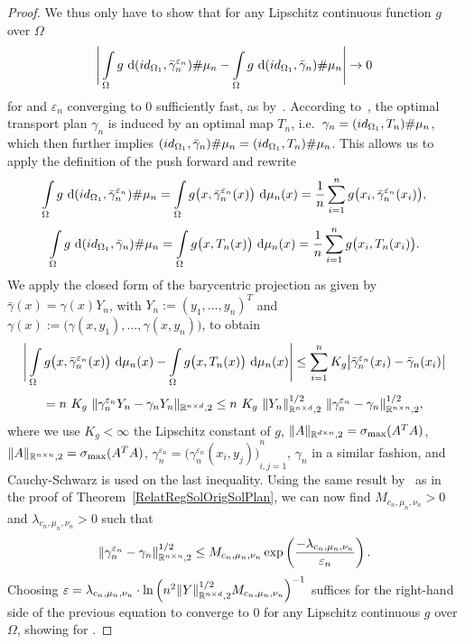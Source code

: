 \begin{proof}
	We thus only have to show that for any Lipschitz continuous function $g$ over $\Omega$
	\[ \Bigg\lvert \int\limits_{\Omega} g~\D[{\push[(id_{\Omega_1}, \bar{\gamma}_n^{\varepsilon_n})]{\mu_n}}] - \int\limits_{\Omega} g~\D[{\push[(id_{\Omega_1}, \bar{\gamma}_n)]{\mu_n}}] \Bigg\rvert \rightarrow 0 \]
	for \Ninf{} and $\varepsilon_n$ converging to $0$ sufficiently fast, as  by\ \cite[Theorem~5.20]{Vill2009}. According to\ \cite{Seg2018}, the optimal transport plan $\gamma_n$ is induced by an optimal map $T_n$, i.e.~$\gamma_n = \push[(id_{\Omega_1}, T_n)]{\mu_n}$, which then further implies $\push[(id_{\Omega_1}, \bar{\gamma}_n)]{\mu_n} = \push[(id_{\Omega_1}, T_n)]{\mu_n}$. This allows us to apply the definition of the push forward and rewrite
	\[ \int\limits_{\Omega} g~\D[{\push[(id_{\Omega_1}, \bar{\gamma}_n^{\varepsilon_n})]{\mu_n}}] = \int\limits_{\Omega} g\big( x, \bar{\gamma}_n^{\varepsilon_n}(x) \big)~\Dx{\mu_n} = \frac{1}{n} \sum\limits_{i = 1}^n g\big( x_i, \bar{\gamma}_n^{\varepsilon_n}(x_i) \big), \]
	\[ \int\limits_{\Omega} g~\D[{\push[(id_{\Omega_1}, \bar{\gamma}_n)]{\mu_n}}] = \int\limits_{\Omega} g\big( x, T_n(x) \big)~\Dx{\mu_n} = \frac{1}{n} \sum\limits_{i = 1}^n g\big( x_i, T_n(x_i) \big). \]
	We apply the closed form of the barycentric projection as given by\ \cite{Seg2018} $\bar{\gamma}(x) = \gamma(x) Y_n$, with $Y_n := {(y_1, \dots, y_n)}^T$ and $\gamma(x) := \big( \gamma(x, y_1), \dots, \gamma(x, y_n) \big)$, to obtain
	\[ \Bigg\lvert \int\limits_{\Omega} g\big( x, \bar{\gamma}_n^{\varepsilon_n}(x) \big)~\Dx{\mu_n} - \int\limits_{\Omega} g\big( x, T_n(x) \big)~\Dx{\mu_n} \Bigg\rvert \le \sum\limits_{i = 1}^n K_g \big\vert \bar{\gamma}_n^{\varepsilon_n}(x_i) - \bar{\gamma}_n(x_i) \big\vert \]
	\[ = n~K_g~\Vert \gamma_n^{\varepsilon_n} Y_n - \gamma_n Y_n \Vert_{\R^{n \times d}, 2} \le n~K_g~\Vert Y_n \Vert_{\R^{n \times d}, 2}^{1/2}~\Vert \gamma_n^{\varepsilon_n} - \gamma_n \Vert^{1/2}_{\R^{n \times n}, 2}, \]
	where we use $K_g < \infty$ the Lipschitz constant of $g$, $\Vert A \Vert_{\R^{d \times n}, 2} = \sigma_{\max}(A^T A)$, $\Vert A \Vert_{\R^{n \times n}, 2} = \sigma_{\max}(A^T A)$, $\gamma_n^{\varepsilon_n} = {\big( \gamma_n^{\varepsilon_n}(x_i, y_j) \big)}_{i, j = 1}^n$, $\gamma_n$ in a similar fashion, and Cauchy-Schwarz is used on the last inequality. Using the same result by\ \cite{Comi1994} as in the proof of Theorem~\ref{RelatRegSolOrigSolPlan}, we can now find $M_{c_n, \mu_n, \nu_n} > 0$ and $\lambda_{c_n, \mu_n, \nu_n} > 0$ such that
	\[ \Vert \gamma_n^{\varepsilon_n} - \gamma_n \Vert^{1/2}_{\R^{n \times n}, 2} \le M_{c_n, \mu_n, \nu_n} \exp\left( \frac{-\lambda_{c_n, \mu_n, \nu_n}}{\varepsilon_n} \right). \]
	Choosing $\varepsilon = \lambda_{c_n, \mu_n, \nu_n} \cdot {\ln\left( n^2 \Vert Y \Vert^{1/2}_{\R^{n \times d}, 2} M_{c_n, \mu_n, \nu_n} \right)}^{-1}$ suffices for the right-hand side of the previous equation to converge to $0$ for any Lipschitz continuous $g$ over $\Omega$, showing  for \Ninf.
\end{proof}

